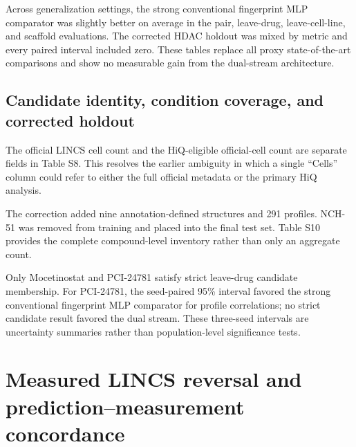 \documentclass[10pt]{article}
\begin{document}








Across generalization settings, the strong conventional fingerprint MLP comparator was slightly better on average in the pair, leave-drug, leave-cell-line, and scaffold evaluations. The corrected HDAC holdout was mixed by metric and every paired interval included zero. These tables replace all proxy state-of-the-art comparisons and show no measurable gain from the dual-stream architecture.

\begin{landscape}
\section{Candidate identity, condition coverage, and corrected holdout}




\end{landscape}

The official LINCS cell count and the HiQ-eligible official-cell count are separate fields in Table S8. This resolves the earlier ambiguity in which a single ``Cells'' column could refer to either the full official metadata or the primary HiQ analysis.



The correction added nine annotation-defined structures and 291 profiles. NCH-51 was removed from training and placed into the final test set. Table S10 provides the complete compound-level inventory rather than only an aggregate count.





Only Mocetinostat and PCI-24781 satisfy strict leave-drug candidate membership. For PCI-24781, the seed-paired 95\% interval favored the strong conventional fingerprint MLP comparator for profile correlations; no strict candidate result favored the dual stream. These three-seed intervals are uncertainty summaries rather than population-level significance tests.

\section{Measured LINCS reversal and prediction--measurement concordance}
\end{document}
